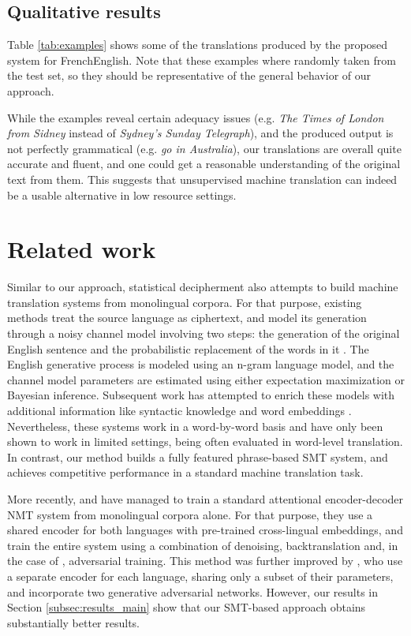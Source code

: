 \documentclass[11pt,a4paper]{article}
\begin{document}
\subsection{Qualitative results} \label{subsec:results_examples}

Table \ref{tab:examples} shows some of the translations produced by the proposed system for FrenchEnglish. Note that these examples where randomly taken from the test set, so they should be representative of the general behavior of our approach.

While the examples reveal certain adequacy issues (e.g. \textit{The Times of London from Sidney} instead of \textit{Sydney's Sunday Telegraph}), and the produced output is not perfectly grammatical (e.g. \textit{go in Australia}), our translations are overall quite accurate and fluent, and one could get a reasonable understanding of the original text from them. This suggests that unsupervised machine translation can indeed be a usable alternative in low resource settings.


\section{Related work} \label{sec:related_work}

Similar to our approach, statistical decipherment also attempts to build machine translation systems from monolingual corpora. For that purpose, existing methods treat the source language as ciphertext, and model its generation through a noisy channel model involving two steps: the generation of the original English sentence and the probabilistic replacement of the words in it \citep{ravi2011deciphering,dou2012large}. The English generative process is modeled using an n-gram language model, and the channel model parameters are estimated using either expectation maximization or Bayesian inference. Subsequent work has attempted to enrich these models with additional information like syntactic knowledge \citep{dou2013dependency} and word embeddings \citep{dou2015unifying}. Nevertheless, these systems work in a word-by-word basis and have only been shown to work in limited settings, being often evaluated in word-level translation. In contrast, our method builds a fully featured phrase-based SMT system, and achieves competitive performance in a standard machine translation task.

More recently, \citet{artetxe2018unsupervised} and \citet{lample2018unsupervised} have managed to train a standard attentional encoder-decoder NMT system from monolingual corpora alone. For that purpose, they use a shared encoder for both languages with pre-trained cross-lingual embeddings, and train the entire system using a combination of denoising, backtranslation and, in the case of \citet{lample2018unsupervised}, adversarial training. This method was further improved by \citet{yang2018unsupervised},
who use a separate encoder for each language, sharing only a subset of their parameters, and incorporate two generative adversarial networks. However, our results in Section \ref{subsec:results_main} show that our SMT-based approach obtains substantially better results.
\end{document}
